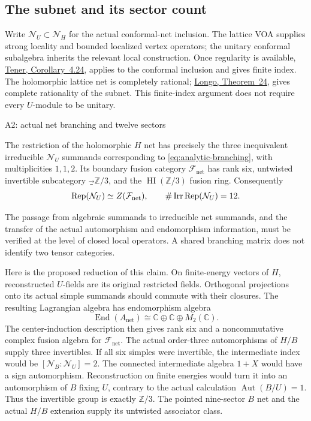 \subsection{The subnet and its sector count}
\label{subsec:analytic-net-count}

Write $\mathcal N_U\subset\mathcal N_H$ for the actual conformal-net
inclusion.  The lattice VOA supplies strong locality and bounded
localized vertex operators; the unitary conformal subalgebra inherits
the relevant local construction.  Once regularity is available,
\href{https://link.springer.com/article/10.1007/s00039-024-00685-8}
{Tener, Corollary~4.24}, applies to the conformal inclusion and gives
finite index.  The holomorphic lattice net is completely rational;
\href{https://arxiv.org/html/math/0102196}
{Longo, Theorem~24}, gives complete rationality of the subnet.
This finite-index argument does not require every $U$-module to be unitary.

\begin{criticalnote}{A2: actual net branching and twelve sectors}
\begin{claim}
\label{clm:analytic-net-count}
The restriction of the holomorphic $H$ net has precisely the three
inequivalent irreducible $\mathcal N_U$ summands corresponding to
\eqref{eq:analytic-branching}, with multiplicities $1,1,2$.
Its boundary fusion category $\mathcal F_{\mathrm{net}}$ has rank six,
untwisted invertible subcategory $\Vec_{\mathbb Z/3}$, and the
$\operatorname{HI}(\mathbb Z/3)$ fusion ring.  Consequently
\[
 \operatorname{Rep}(\mathcal N_U)\simeq Z(\mathcal F_{\mathrm{net}}),
 \qquad
 \#\operatorname{Irr}\operatorname{Rep}(\mathcal N_U)=12.
\]
\end{claim}
The passage from algebraic summands to irreducible net summands, and
the transfer of the actual automorphism and endomorphism information,
must be verified at the level of closed local operators.  A shared
branching matrix does not identify two tensor categories.
\end{criticalnote}

Here is the proposed reduction of this claim.  On finite-energy vectors
of $H$, reconstructed $U$-fields are its original restricted fields.
Orthogonal projections onto its actual simple summands should commute
with their closures.  The resulting Lagrangian algebra has endomorphism
algebra
\begin{equation}
 \operatorname{End}(A_{\mathrm{net}})
 \cong\mathbb C\oplus\mathbb C\oplus M_2(\mathbb C).
 \label{eq:analytic-end-algebra}
\end{equation}
The center-induction description then gives rank six and a
noncommutative complex fusion algebra for $\mathcal F_{\mathrm{net}}$.
The actual order-three automorphisms of $H/B$ supply three invertibles.
If all six simples were invertible, the intermediate index would be
$[\mathcal N_B:\mathcal N_U]=2$.  The connected intermediate algebra
$1+X$ would have a sign automorphism.  Reconstruction on finite energies
would turn it into an automorphism of $B$ fixing $U$, contrary to the
actual calculation $\operatorname{Aut}(B/U)=1$.  Thus the invertible
group is exactly $\mathbb Z/3$.  The pointed nine-sector $B$ net and the
actual $H/B$ extension supply its untwisted associator class.

